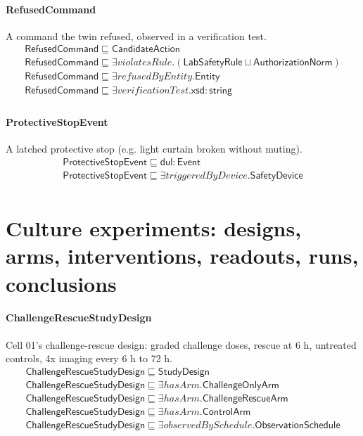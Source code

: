 \documentclass[10pt]{article}
\begin{document}
\paragraph{RefusedCommand} A command the twin refused, observed in a verification test.
\[\begin{array}{l}
\mathsf{RefusedCommand} \sqsubseteq  \mathsf{CandidateAction} \\
\mathsf{RefusedCommand} \sqsubseteq  \exists \mathit{violatesRule}.(\mathsf{LabSafetyRule} \sqcup  \mathsf{AuthorizationNorm}) \\
\mathsf{RefusedCommand} \sqsubseteq  \exists \mathit{refusedByEntity}.\mathsf{Entity} \\
\mathsf{RefusedCommand} \sqsubseteq  \exists \mathit{verificationTest}.\mathsf{xsd{:}string} \\
\end{array}\]
\paragraph{ProtectiveStopEvent} A latched protective stop (e.g. light curtain broken without muting).
\[\begin{array}{l}
\mathsf{ProtectiveStopEvent} \sqsubseteq  \mathsf{dul{:}Event} \\
\mathsf{ProtectiveStopEvent} \sqsubseteq  \exists \mathit{triggeredByDevice}.\mathsf{SafetyDevice} \\
\end{array}\]
\section*{Culture experiments: designs, arms, interventions, readouts, runs, conclusions}
\paragraph{ChallengeRescueStudyDesign} Cell 01's challenge-rescue design: graded challenge doses, rescue at 6 h, untreated controls, 4x imaging every 6 h to 72 h.
\[\begin{array}{l}
\mathsf{ChallengeRescueStudyDesign} \sqsubseteq  \mathsf{StudyDesign} \\
\mathsf{ChallengeRescueStudyDesign} \sqsubseteq  \exists \mathit{hasArm}.\mathsf{ChallengeOnlyArm} \\
\mathsf{ChallengeRescueStudyDesign} \sqsubseteq  \exists \mathit{hasArm}.\mathsf{ChallengeRescueArm} \\
\mathsf{ChallengeRescueStudyDesign} \sqsubseteq  \exists \mathit{hasArm}.\mathsf{ControlArm} \\
\mathsf{ChallengeRescueStudyDesign} \sqsubseteq  \exists \mathit{observedBySchedule}.\mathsf{ObservationSchedule} \\
\end{array}\]
\end{document}
